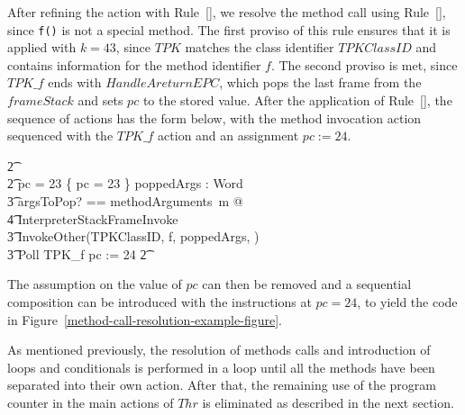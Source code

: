 After refining the action with
Rule~[], we resolve the method call
using Rule~[], since \texttt{f()}
is not a special method.
The first proviso of this rule ensures that it is applied with
$k = 43$, since $TPK$ matches the class identifier $TPKClassID$ and
contains information for the method identifier $f$.
The second proviso is met, since $TPK\_f$ ends with
$HandleAreturnEPC$, which pops the last frame from the $frameStack$
and sets $pc$ to the stored value.
After the application of Rule~[],
the sequence of actions has the form below, with the method invocation
action sequenced with the $TPK\_f$ action and an assignment
$pc := 24$.
\begin{circusaction}
  \t2 {} \cdots {} \\
  \t2 {} \circelse pc = 23 \circthen \{ pc = 23 \} \circseq \circvar poppedArgs : \seq Word \circspot \\
  \t3 \lschexpract \exists argsToPop? == methodArguments~m @ \\
  \t4 InterpreterStackFrameInvoke \rschexpract \circseq \\
  \t3 InvokeOther(TPKClassID, f, poppedArgs, \true) \circseq \\
  \t3 Poll \circseq TPK\_f \circseq pc := 24
  \t2 {} \cdots {}
\end{circusaction}
The assumption on the value of $pc$ can then be removed and a
sequential composition can be introduced with the instructions at
$pc = 24$, to yield the code in
Figure~\ref{method-call-resolution-example-figure}.

As mentioned previously, the resolution of methods calls and
introduction of loops and conditionals is performed in a loop until all
the methods have been separated into their own action.
After that, the remaining use of the program counter in the main
actions of $Thr$ is eliminated as described in the next section.